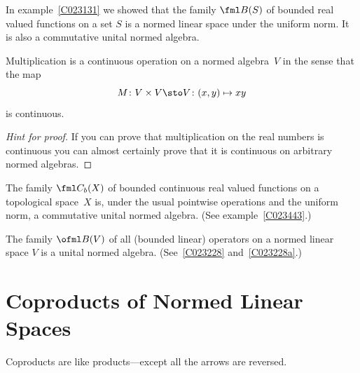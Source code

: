 \begin{exam}\label{C023448} In example~\ref{C023131} we showed that the family
$\fml B(S)$ of bounded real valued functions on a set $S$ is a normed linear space under
the uniform norm.  It is also a commutative unital normed algebra.
\end{exam}

\begin{prop} Multiplication is a continuous operation on a normed algebra~$V$ in the sense
that the map
   \[ M \colon V \times V \sto V \colon (x,y) \mapsto  xy \]
is continuous.
\end{prop}

\begin{proof}[\emph{Hint for proof}] If you can prove that multiplication on the real numbers
is continuous you can almost certainly prove that it is continuous on arbitrary normed
algebras. \ns
\end{proof}

\begin{exam}\label{C023454} The family $\fml C_b(X)$ of bounded continuous real valued
functions on a topological space~$X$ is, under the usual pointwise operations and the
uniform norm, a commutative unital normed algebra. (See example~\ref{C023443}.)
\end{exam}

\begin{exam}\label{C023456} The family $\ofml B(V)$ of all (bounded linear) operators
on a normed linear space $V$ is a unital normed algebra. (See~\ref{C023228} and~\ref{C023228a}.)
\end{exam}





























\section{Coproducts of Normed Linear Spaces}\label{C0156}
Coproducts are like products---except all the arrows are reversed.

